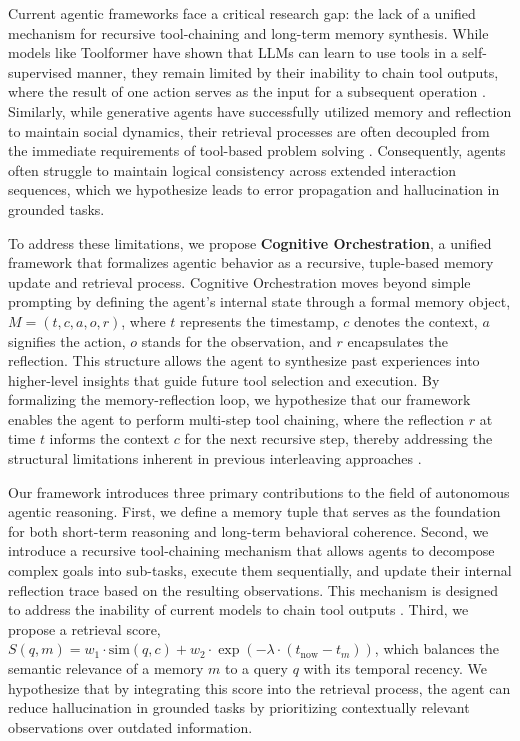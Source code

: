 \documentclass[11pt,a4paper]{article}
\begin{document}
Current agentic frameworks face a critical research gap: the lack of a unified mechanism for recursive tool-chaining and long-term memory synthesis. While models like Toolformer have shown that LLMs can learn to use tools in a self-supervised manner, they remain limited by their inability to chain tool outputs, where the result of one action serves as the input for a subsequent operation \cite{schick2023}. Similarly, while generative agents have successfully utilized memory and reflection to maintain social dynamics, their retrieval processes are often decoupled from the immediate requirements of tool-based problem solving \cite{park2023}. Consequently, agents often struggle to maintain logical consistency across extended interaction sequences, which we hypothesize leads to error propagation and hallucination in grounded tasks.

To address these limitations, we propose \textbf{Cognitive Orchestration}, a unified framework that formalizes agentic behavior as a recursive, tuple-based memory update and retrieval process. Cognitive Orchestration moves beyond simple prompting by defining the agent's internal state through a formal memory object, $M = (t, c, a, o, r)$, where $t$ represents the timestamp, $c$ denotes the context, $a$ signifies the action, $o$ stands for the observation, and $r$ encapsulates the reflection. This structure allows the agent to synthesize past experiences into higher-level insights that guide future tool selection and execution. By formalizing the memory-reflection loop, we hypothesize that our framework enables the agent to perform multi-step tool chaining, where the reflection $r$ at time $t$ informs the context $c$ for the next recursive step, thereby addressing the structural limitations inherent in previous interleaving approaches \cite{yao2023}.

Our framework introduces three primary contributions to the field of autonomous agentic reasoning. First, we define a memory tuple that serves as the foundation for both short-term reasoning and long-term behavioral coherence. Second, we introduce a recursive tool-chaining mechanism that allows agents to decompose complex goals into sub-tasks, execute them sequentially, and update their internal reflection trace based on the resulting observations. This mechanism is designed to address the inability of current models to chain tool outputs \cite{schick2023}. Third, we propose a retrieval score, $S(q, m) = w_1 \cdot \text{sim}(q, c) + w_2 \cdot \exp(-\lambda \cdot (t_{\text{now}} - t_m))$, which balances the semantic relevance of a memory $m$ to a query $q$ with its temporal recency. We hypothesize that by integrating this score into the retrieval process, the agent can reduce hallucination in grounded tasks by prioritizing contextually relevant observations over outdated information.
\end{document}
